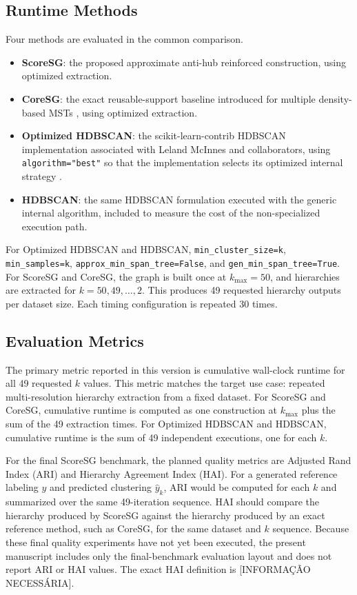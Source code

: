 \documentclass[11pt]{article}
\begin{document}
\subsection{Runtime Methods}

Four methods are evaluated in the common comparison.
\begin{itemize}[leftmargin=*]
  \item \textbf{ScoreSG}: the proposed approximate anti-hub reinforced construction, using optimized extraction.
  \item \textbf{CoreSG}: the exact reusable-support baseline introduced for multiple density-based MSTs \citep{araujo2022coresg}, using optimized extraction.
  \item \textbf{Optimized HDBSCAN}: the scikit-learn-contrib HDBSCAN implementation associated with Leland McInnes and collaborators, using \texttt{algorithm="best"} so that the implementation selects its optimized internal strategy \citep{mcinnes2017accelerated,hdbscansoftware}.
  \item \textbf{HDBSCAN}: the same HDBSCAN formulation executed with the generic internal algorithm, included to measure the cost of the non-specialized execution path.
\end{itemize}

For Optimized HDBSCAN and HDBSCAN, \texttt{min\_cluster\_size=k}, \texttt{min\_samples=k}, \texttt{approx\_min\_span\_tree=False}, and \texttt{gen\_min\_span\_tree=True}. For ScoreSG and CoreSG, the graph is built once at \(k_{\max}=50\), and hierarchies are extracted for \(k=50,49,\ldots,2\). This produces 49 requested hierarchy outputs per dataset size. Each timing configuration is repeated 30 times.

\subsection{Evaluation Metrics}

The primary metric reported in this version is cumulative wall-clock runtime for all 49 requested \(k\) values. This metric matches the target use case: repeated multi-resolution hierarchy extraction from a fixed dataset. For ScoreSG and CoreSG, cumulative runtime is computed as one construction at \(k_{\max}\) plus the sum of the 49 extraction times. For Optimized HDBSCAN and HDBSCAN, cumulative runtime is the sum of 49 independent executions, one for each \(k\).

For the final ScoreSG benchmark, the planned quality metrics are Adjusted Rand Index (ARI) \citep{hubert1985comparing} and Hierarchy Agreement Index (HAI). For a generated reference labeling \(y\) and predicted clustering \(\hat{y}_k\), ARI would be computed for each \(k\) and summarized over the same 49-iteration sequence. HAI should compare the hierarchy produced by ScoreSG against the hierarchy produced by an exact reference method, such as CoreSG, for the same dataset and \(k\) sequence. Because these final quality experiments have not yet been executed, the present manuscript includes only the final-benchmark evaluation layout and does not report ARI or HAI values. The exact HAI definition is [INFORMAÇÃO NECESSÁRIA].
\end{document}
